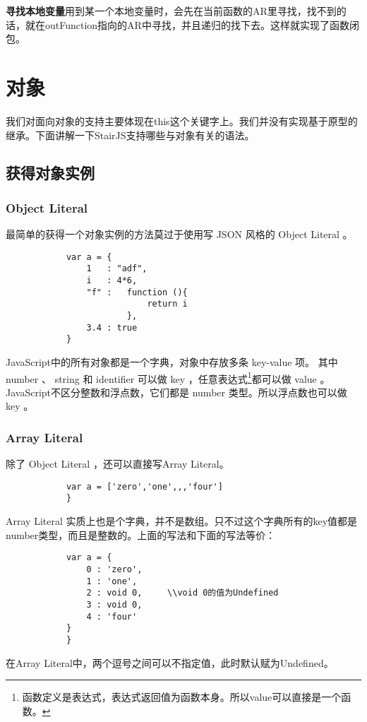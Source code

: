 \documentclass[a4paper]{article}
\begin{document}
\begin{CJK}{UTF8}{gbsn}
        {\bf 寻找本地变量}用到某一个本地变量时，会先在当前函数的AR里寻找，找不到的话，就在outFunction指向的AR中寻找，并且递归的找下去。这样就实现了函数闭包。

\section{对象}
    我们对面向对象的支持主要体现在this这个关键字上。我们并没有实现基于原型的继承。下面讲解一下StairJS支持哪些与对象有关的语法。
    \subsection{获得对象实例}
        \subsubsection{Object Literal}
            最简单的获得一个对象实例的方法莫过于使用写 JSON 风格的 Object Literal 。
            \begin{verbatim}
            var a = {
                1   : "adf",
                i   : 4*6,
                "f" :   function (){
                            return i
                        },
                3.4 : true
            }
            \end{verbatim}
            JavaScript中的所有对象都是一个字典，对象中存放多条 key-value 项。 其中 number 、 string 和 identifier 可以做 key ，任意表达式\footnote{函数定义是表达式，表达式返回值为函数本身。所以value可以直接是一个函数。}都可以做 value 。JavaScript不区分整数和浮点数，它们都是 number 类型。所以浮点数也可以做 key 。

        \subsubsection{Array Literal}
            除了 Object Literal ，还可以直接写Array Literal。
            \begin{verbatim}
            var a = ['zero','one',,,'four']
            }
            \end{verbatim}
            Array Literal 实质上也是个字典，并不是数组。只不过这个字典所有的key值都是number类型，而且是整数的。上面的写法和下面的写法等价：
            \begin{verbatim}
            var a = {
                0 : 'zero',
                1 : 'one',
                2 : void 0,     \\void 0的值为Undefined
                3 : void 0,
                4 : 'four'
            }
            }
            \end{verbatim}
            在Array Literal中，两个逗号之间可以不指定值，此时默认赋为Undefined。


\end{CJK}
\end{document}
